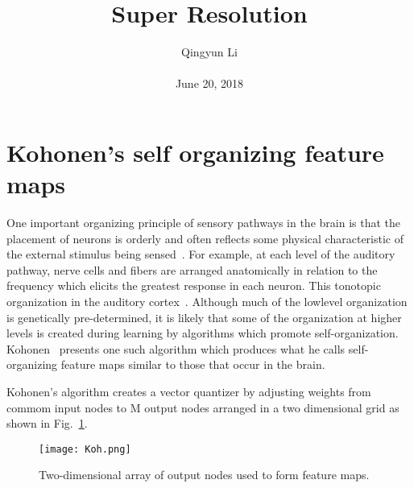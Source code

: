 \documentclass[10pt,twocolumn,letterpaper]{article}
\begin{document}
\author{Qingyun Li\\\\
June 20, 2018}        
\title{Super Resolution}

\maketitle

\section{Kohonen's self organizing feature maps}
\par One important organizing principle of sensory pathways in the brain is that the placement of neurons is orderly and often reflects some physical characteristic of the external stimulus being sensed~\cite{kandel2000principles}. For example, at each level of the auditory pathway, nerve cells and fibers are arranged anatomically in relation to the frequency which elicits the greatest response in each neuron. This tonotopic organization in the auditory cortex~\cite{kandel2000principles}. Although much of the lowlevel organization is genetically pre-determined, it is likely that some of the organization at higher levels is created during learning by algorithms which promote self-organization. Kohonen~\cite{Kohonen1984Self} presents one such algorithm which produces what he calls self-organizing feature maps similar to those that occur in the brain.
\par Kohonen's algorithm creates a vector quantizer by adjusting weights from commom input nodes to M output nodes arranged in a two dimensional grid as shown in Fig.~\ref{17}. 
\begin{figure}[t]
 \centering{}
\texttt{[image: Koh.png]}\\
 \caption{Two-dimensional array of output nodes used to form feature maps.}
\label{17}
\end{figure}
 
 
\end{document}
